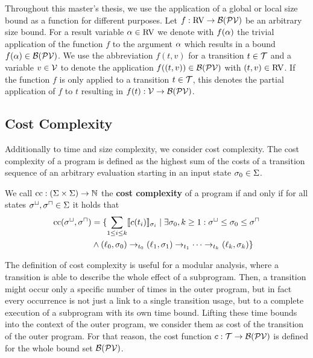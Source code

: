 Throughout this master's thesis, we use the application of a global or local size bound as a function for different purposes.
Let $f: \text{RV} \rightarrow \mathcal{B}(\mathcal{PV})$ be an arbitrary size bound.
For a result variable $\alpha \in \text{RV}$ we denote with $f(\alpha)$ the trivial application of the function $f$ to the argument $\alpha$ which results in a bound $f(\alpha) \in \mathcal{B}(\mathcal{PV})$.
We use the abbreviation $f(t, v)$ for a transition $t \in \mathcal{T}$ and a variable $v \in \mathcal{V}$ to denote the application $f((t,v)) \in \mathcal{B}(\mathcal{PV})$ with $(t,v) \in \text{RV}$.
If the function $f$ is only applied to a transition $t \in \mathcal{T}$, this denotes the partial application of $f$ to $t$ resulting in $f(t): \mathcal{V} \rightarrow \mathcal{B}(\mathcal{PV})$.

\subsection{Cost Complexity}

Additionally to time and size complexity, we consider cost complexity.
The cost complexity of a program is defined as the highest sum of the costs of a transition sequence of an arbitrary evaluation starting in an input state $\sigma_0 \in \Sigma$.

\begin{definition}
  We call $\text{cc}: (\Sigma \times \Sigma) \rightarrow \mathbb{N}$ the \textbf{cost complexity} of a program if and only if for all states ${\sigma^\sqcup}, {\sigma^\sqcap} \in \Sigma$ it holds that
  \begin{align*}
    \text{cc}({\sigma^\sqcup}, {\sigma^\sqcap}) &=
    \lbrace  \sum_{1 \leq i \leq k} \llbracket c(t_i) \rrbracket_{\sigma_i} \mid \exists \sigma_0, k \geq 1: {\sigma^\sqcup} \leq \sigma_0 \leq {\sigma^\sqcap} \\
      &\wedge (\ell_0, \sigma_0) \rightarrow_{t_0} (\ell_1, \sigma_1) \rightarrow_{t_1} \dots \rightarrow_{t_k} (\ell_k, \sigma_k)  \rbrace
  \end{align*}
\end{definition}

The definition of cost complexity is useful for a modular analysis, where a transition is able to describe the whole effect of a subprogram.
Then, a transition might occur only a specific number of times in the outer program, but in fact every occurrence is not just a link to a single transition usage, but to a complete execution of a subprogram with its own time bound.
Lifting these time bounds into the context of the outer program, we consider them as cost of the transition of the outer program.
For that reason, the cost function $c: \mathcal{T} \rightarrow \mathcal{B}(\mathcal{PV})$ is defined for the whole bound set $\mathcal{B}(\mathcal{PV})$.

